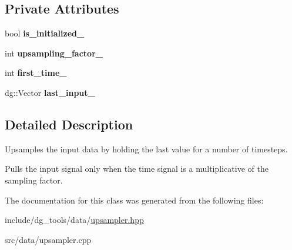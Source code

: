 \subsection*{Private Attributes}
\begin{DoxyCompactItemize}
\item 
bool {\bfseries is\+\_\+initialized\+\_\+}\hypertarget{classdg__tools_1_1Upsampler_a083755393f8f65c571ecfbcd14a268a2}{}\label{classdg__tools_1_1Upsampler_a083755393f8f65c571ecfbcd14a268a2}

\item 
int {\bfseries upsampling\+\_\+factor\+\_\+}\hypertarget{classdg__tools_1_1Upsampler_a398d113b1b385ee0f8d702c859511b64}{}\label{classdg__tools_1_1Upsampler_a398d113b1b385ee0f8d702c859511b64}

\item 
int {\bfseries first\+\_\+time\+\_\+}\hypertarget{classdg__tools_1_1Upsampler_a78d524bb8e514007cdf75f1dbff67469}{}\label{classdg__tools_1_1Upsampler_a78d524bb8e514007cdf75f1dbff67469}

\item 
dg\+::\+Vector {\bfseries last\+\_\+input\+\_\+}\hypertarget{classdg__tools_1_1Upsampler_aa54f6ee308bfae9dd26740927319fa4b}{}\label{classdg__tools_1_1Upsampler_aa54f6ee308bfae9dd26740927319fa4b}

\end{DoxyCompactItemize}


\subsection{Detailed Description}
Upsamples the input data by holding the last value for a number of timesteps. 

Pulls the input signal only when the time signal is a multiplicative of the sampling factor. 

The documentation for this class was generated from the following files\+:\begin{DoxyCompactItemize}
\item 
include/dg\+\_\+tools/data/\hyperlink{upsampler_8hpp}{upsampler.\+hpp}\item 
src/data/upsampler.\+cpp\end{DoxyCompactItemize}
